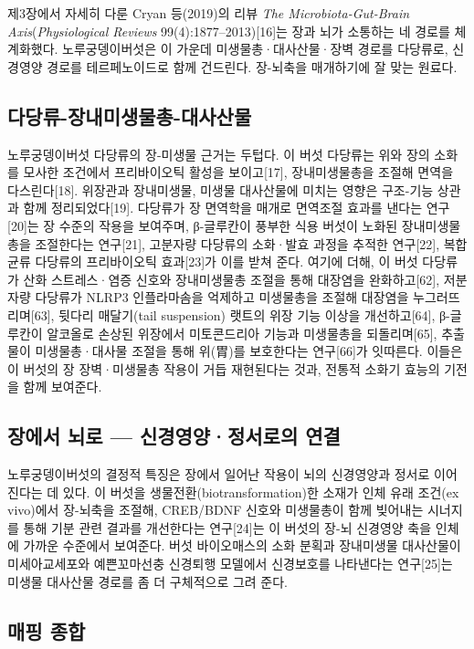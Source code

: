 \documentclass[12pt,oneside]{book}
\begin{document}
제3장에서 자세히 다룬 Cryan 등(2019)의 리뷰 \textit{The Microbiota-Gut-Brain Axis}(\textit{Physiological Reviews} 99(4):1877–2013)[16]는 장과 뇌가 소통하는 네 경로를 체계화했다. 노루궁뎅이버섯은 이 가운데 미생물총·대사산물·장벽 경로를 다당류로, 신경영양 경로를 테르페노이드로 함께 건드린다. 장-뇌축을 매개하기에 잘 맞는 원료다.

\subsection{다당류-장내미생물총-대사산물}

노루궁뎅이버섯 다당류의 장-미생물 근거는 두텁다. 이 버섯 다당류는 위와 장의 소화를 모사한 조건에서 프리바이오틱 활성을 보이고[17], 장내미생물총을 조절해 면역을 다스린다[18]. 위장관과 장내미생물, 미생물 대사산물에 미치는 영향은 구조-기능 상관과 함께 정리되었다[19]. 다당류가 장 면역학을 매개로 면역조절 효과를 낸다는 연구[20]는 장 수준의 작용을 보여주며, β-글루칸이 풍부한 식용 버섯이 노화된 장내미생물총을 조절한다는 연구[21], 고분자량 다당류의 소화·발효 과정을 추적한 연구[22], 복합 균류 다당류의 프리바이오틱 효과[23]가 이를 받쳐 준다. 여기에 더해, 이 버섯 다당류가 산화 스트레스·염증 신호와 장내미생물총 조절을 통해 대장염을 완화하고[62], 저분자량 다당류가 NLRP3 인플라마솜을 억제하고 미생물총을 조절해 대장염을 누그러뜨리며[63], 뒷다리 매달기(tail suspension) 랫트의 위장 기능 이상을 개선하고[64], β-글루칸이 알코올로 손상된 위장에서 미토콘드리아 기능과 미생물총을 되돌리며[65], 추출물이 미생물총·대사물 조절을 통해 위(胃)를 보호한다는 연구[66]가 잇따른다. 이들은 이 버섯의 장 장벽·미생물총 작용이 거듭 재현된다는 것과, 전통적 소화기 효능의 기전을 함께 보여준다.

\subsection{장에서 뇌로 — 신경영양·정서로의 연결}

노루궁뎅이버섯의 결정적 특징은 장에서 일어난 작용이 뇌의 신경영양과 정서로 이어진다는 데 있다. 이 버섯을 생물전환(biotransformation)한 소재가 인체 유래 조건(ex vivo)에서 장-뇌축을 조절해, CREB/BDNF 신호와 미생물총이 함께 빚어내는 시너지를 통해 기분 관련 결과를 개선한다는 연구[24]는 이 버섯의 장-뇌 신경영양 축을 인체에 가까운 수준에서 보여준다. 버섯 바이오매스의 소화 분획과 장내미생물 대사산물이 미세아교세포와 예쁜꼬마선충 신경퇴행 모델에서 신경보호를 나타낸다는 연구[25]는 미생물 대사산물 경로를 좀 더 구체적으로 그려 준다.

\subsection{매핑 종합}
\end{document}
